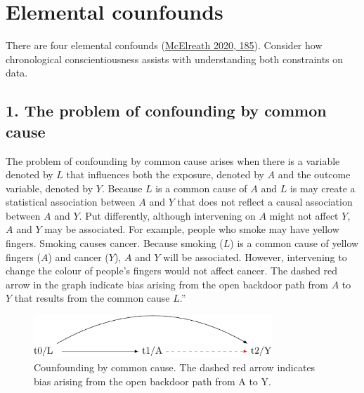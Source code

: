 \documentclass[
  singlecolumn]{report}
\begin{document}
\hypertarget{elemental-counfounds}{%
\section{Elemental counfounds}\label{elemental-counfounds}}

There are four elemental confounds
(\protect\hyperlink{ref-mcelreath2020}{McElreath 2020, 185}). Consider
how chronological conscientiousness assists with understanding both
constraints on data.

\hypertarget{the-problem-of-confounding-by-common-cause}{%
\subsection{1. The problem of confounding by common
cause}\label{the-problem-of-confounding-by-common-cause}}

The problem of confounding by common cause arises when there is a
variable denoted by \(L\) that influences both the exposure, denoted by
\(A\) and the outcome variable, denoted by \(Y.\) Because \(L\) is a
common cause of \(A\) and \(L\) is may create a statistical association
between \(A\) and \(Y\) that does not reflect a causal association
between \(A\) and \(Y\). Put differently, although intervening on \(A\)
might not affect \(Y\), \(A\) and \(Y\) may be associated. For example,
people who smoke may have yellow fingers. Smoking causes cancer. Because
smoking (\(L\)) is a common cause of yellow fingers (\(A\)) and cancer
(\(Y\)), \(A\) and \(Y\) will be associated. However, intervening to
change the colour of people's fingers would not affect cancer. The
dashed red arrow in the graph indicate bias arising from the open
backdoor path from \(A\) to \(Y\) that results from the common cause
\(L\).''

\begin{figure}

{\centering \includegraphics[width=0.8\textwidth,height=\textheight]{causal-dags_files/figure-pdf/fig-dag-common-cause-1.pdf}

}

\caption{\label{fig-dag-common-cause}Counfounding by common cause. The
dashed red arrow indicates bias arising from the open backdoor path from
A to Y.}

\end{figure}
\end{document}
